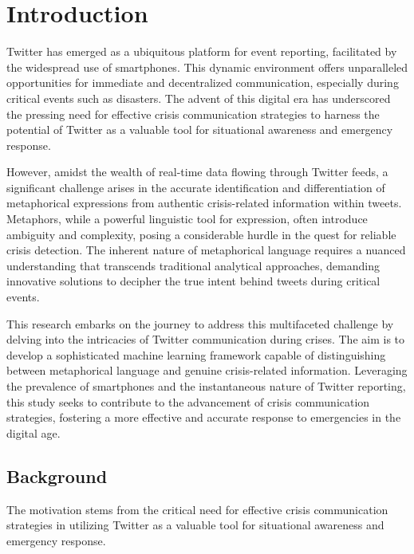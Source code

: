 \chapter{Introduction}
\label{ch:into} %

Twitter has emerged as a ubiquitous platform for event reporting, facilitated by the widespread use of smartphones. This dynamic environment offers unparalleled opportunities for immediate and decentralized communication, especially during critical events such as disasters. The advent of this digital era has underscored the pressing need for effective crisis communication strategies to harness the potential of Twitter as a valuable tool for situational awareness and emergency response.

However, amidst the wealth of real-time data flowing through Twitter feeds, a significant challenge arises in the accurate identification and differentiation of metaphorical expressions from authentic crisis-related information within tweets. Metaphors, while a powerful linguistic tool for expression, often introduce ambiguity and complexity, posing a considerable hurdle in the quest for reliable crisis detection. The inherent nature of metaphorical language requires a nuanced understanding that transcends traditional analytical approaches, demanding innovative solutions to decipher the true intent behind tweets during critical events.

This research embarks on the journey to address this multifaceted challenge by delving into the intricacies of Twitter communication during crises. The aim is to develop a sophisticated machine learning framework capable of distinguishing between metaphorical language and genuine crisis-related information. Leveraging the prevalence of smartphones and the instantaneous nature of Twitter reporting, this study seeks to contribute to the advancement of crisis communication strategies, fostering a more effective and accurate response to emergencies in the digital age.

\section{Background}
\label{sec:into_back}
The motivation stems from the critical need for effective crisis communication strategies in utilizing Twitter as a valuable tool for situational awareness and emergency response.

